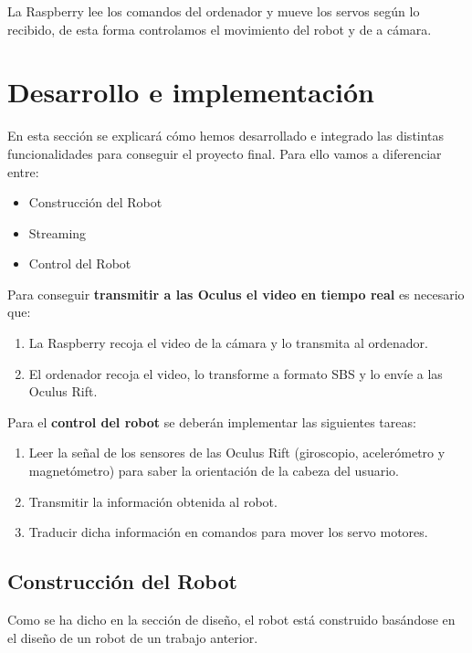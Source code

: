 \documentclass[twoside, 11pt]{epstfg}
\begin{document}
La Raspberry lee los comandos del ordenador y mueve los servos según lo recibido, de esta forma controlamos el movimiento del robot y de a cámara.

\newpage
\chapter{Desarrollo e implementación}


En esta sección se explicará cómo hemos desarrollado e integrado las distintas funcionalidades para conseguir el proyecto final.
Para ello vamos a diferenciar entre:

\begin{itemize}
	\item Construcción del Robot
	\item Streaming 
	\item Control del Robot
\end{itemize}

Para conseguir \textbf{transmitir a las Oculus el video en tiempo real} es necesario que:
\begin{enumerate}
	\item La Raspberry recoja el video de la cámara y lo transmita al ordenador.
	
	\item El ordenador recoja el video, lo transforme a formato SBS y lo envíe a las Oculus Rift. 
	
\end{enumerate}





Para el \textbf{control del robot} se deberán implementar las siguientes tareas:

\begin{enumerate}
	\item Leer la señal de los sensores de las Oculus Rift (giroscopio, acelerómetro y magnetómetro) para saber la orientación de la cabeza del usuario.
	
	\item Transmitir la información obtenida al robot.
	
	\item Traducir dicha información en comandos para mover los servo motores.
\end{enumerate} 
\section{Construcción del Robot}
Como se ha dicho en la sección de diseño, el robot está construido basándose en el diseño de un robot de un trabajo anterior.
\end{document}
